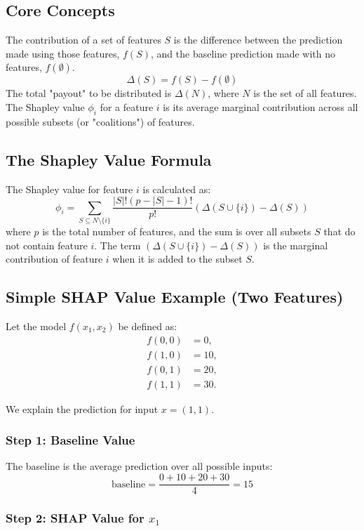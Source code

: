 \documentclass{article}
\begin{document}
\begin{multicols}{2}
	\subsection{Core Concepts}
	The contribution of a set of features $S$ is the difference between the prediction made using those features, $f(S)$, and the baseline prediction made with no features, $f(\emptyset)$.
	$$ \Delta(S) = f(S) - f(\emptyset) $$
	The total "payout" to be distributed is $\Delta(N)$, where $N$ is the set of all features. The Shapley value $\phi_i$ for a feature $i$ is its average marginal contribution across all possible subsets (or "coalitions") of features.

	\subsection{The Shapley Value Formula}
	The Shapley value for feature $i$ is calculated as:
	$$ \phi_i = \sum_{S \subseteq N \setminus \{i\}} \frac{|S|!(p - |S| - 1)!}{p!} \left( \Delta(S \cup \{i\}) - \Delta(S) \right) $$
	where $p$ is the total number of features, and the sum is over all subsets $S$ that do not contain feature $i$. The term $(\Delta(S \cup \{i\}) - \Delta(S))$ is the marginal contribution of feature $i$ when it is added to the subset $S$.


	\subsection{Simple SHAP Value Example (Two Features)}

	Let the model \( f(x_1, x_2) \) be defined as:
	\[
		\begin{aligned}
			f(0,0) & = 0,  \\
			f(1,0) & = 10, \\
			f(0,1) & = 20, \\
			f(1,1) & = 30.
		\end{aligned}
	\]

	We explain the prediction for input \( x = (1, 1) \).

	\subsubsection{Step 1: Baseline Value}

	The baseline is the average prediction over all possible inputs:
	\[
		\text{baseline} = \frac{0 + 10 + 20 + 30}{4} = 15
	\]

	\subsubsection{Step 2: SHAP Value for \( x_1 \)}


\end{multicols}
\end{document}

